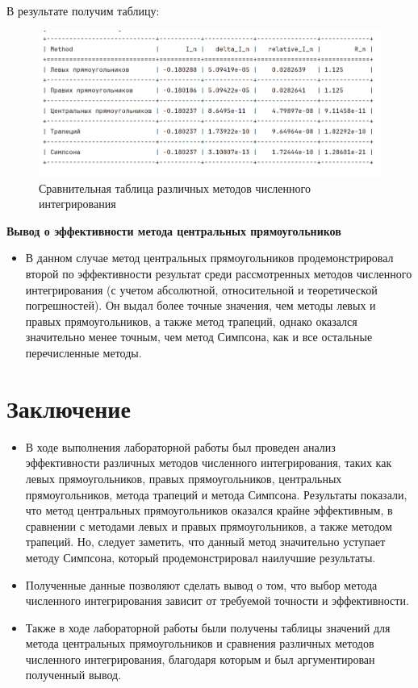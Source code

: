 \documentclass{article}
\begin{document}
В результате получим таблицу:
\begin{figure}[H]
    \centering
    \includegraphics[width=1\textwidth]{lab_4_2.png}
    \caption{ Сравнительная таблица различных методов численного интегрирования}
    \label{fig:my_label}
\end{figure}


\textbf{\large{Вывод о эффективности метода центральных прямоугольников}} \\
\begin{itemize}
    \item В данном случае метод центральных прямоугольников продемонстрировал второй по эффективности результат среди рассмотренных методов численного интегрирования (с учетом абсолютной, относительной и теоретической погрешностей). Он выдал более точные значения, чем методы левых и правых прямоугольников, а также метод трапеций, однако оказался значительно менее точным, чем метод Симпсона, как и все остальные перечисленные методы.
\end{itemize}

\section*{Заключение}
 \begin{itemize}
     \item В ходе выполнения лабораторной работы был проведен анализ эффективности различных методов численного интегрирования, таких как левых прямоугольников, правых прямоугольников, центральных прямоугольников, метода трапеций и метода Симпсона.  Результаты показали, что метод центральных прямоугольников оказался крайне эффективным, в сравнении с методами левых и правых прямоугольников, а также методом трапеций. Но, следует заметить, что данный метод значительно уступает методу Симпсона, который продемонстрировал наилучшие результаты.
     \item Полученные данные позволяют сделать вывод о том, что выбор метода численного интегрирования зависит от требуемой точности и эффективности.
     \item Также в ходе лабораторной работы были получены таблицы  значений для метода центральных прямоугольников и сравнения различных методов численного интегрирования, благодаря которым и был аргументирован полученный вывод.
     
 \end{itemize}
\end{document}
